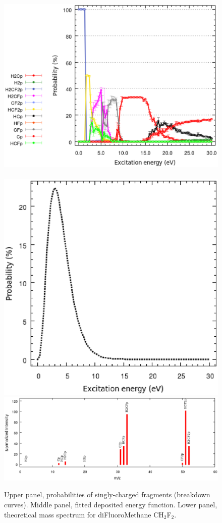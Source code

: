\documentclass[a4paper,12pt]{article}
\begin{document}
\clearpage
\begin{figure}[h!]
\centering
\includegraphics[scale=0.45]{images/CH2F2+-S.vs.E.eps}\\
\qquad\qquad\,\,
\includegraphics[scale=0.45]{images/CH2F2+-sfE.eps}\\
\includegraphics[scale=0.45]{images/CH2F2-theoSpectrum.eps}
\caption{\footnotesize{
Upper panel, probabilities of singly-charged fragments (breakdown curves). Middle panel, fitted deposited energy function. Lower panel, theoretical mass 
spectrum for diFluoroMethane CH$_2$F$_2$.
}}
\label{fig: theoretical mass spectrum difluoromethane}
\end{figure}
\end{document}
